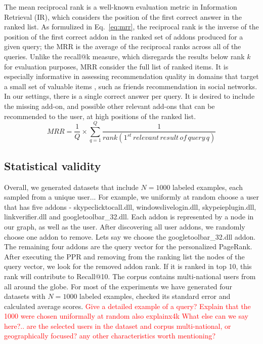 \documentclass[11pt,oneside]{book}
\let\Oldsubsection\subsection
\renewcommand{\subsection}{\FloatBarrier\Oldsubsection}
\begin{document}
The mean reciprocal rank \citep{voorhees1999trec} is a
well-known evaluation metric in Information Retrieval (IR), which considers the position of the first correct
answer in the ranked list.  As formulized in Eq.~\eqref{eq:mrr}, the reciprocal rank is the inverse of the position of the first correct addon in the ranked set of addons produced for a given query; the MRR is the average of the reciprocal ranks across all of the queries. Unlike the recall@k measure, which disregards the results below rank $k$ for evaluation purposes, MRR consider the full list of ranked items. It is especially informative in assessing recommendation quality in domains that target a small set of valuable items \citep{chen2006less}, such as friends recommendation in social
networks. In our settings, there is a single correct answer per query. It is desired to include the missing add-on, and possible other relevant add-ons that can be recommended to the user, at high positions of the ranked list.
\begin{equation}
 MRR = \frac{1}{Q} \times \displaystyle\sum\limits_{q=1}^{Q} \frac{1}{rank(1^{st} \, relevant \, result \, of \, query \, q)}
\label{eq:mrr}
\end{equation}

\subsection{Statistical validity}

Overall, we generated datasets that include $N=1000$ labeled examples, each sampled from a unique user...
For example, we uniformly at random choose a user that has five addons - skypeclicktocall.dll, windowslivelogin.dll, skypeieplugin.dll, linkverifier.dll and googletoolbar\_32.dll. Each addon is represented by a node in our graph, as well as the user. After discovering all user addons, we randomly choose one addon to remove. Lets say we choose the googletoolbar\_32.dll addon. The remaining four addons are the query vector for the personalized PageRank. After executing the PPR and removing from the ranking list the nodes of the query vector, we look for the removed addon rank. If it is ranked in top 10, this rank will contribute to Recall@10.
The corpus contains multi-national users from all around the globe.
For most of the experiments we have generated four datasets with $N=1000$ labeled examples, checked its standard error and calculated average scores.
\iffalse
\textcolor{red}{Give a detailed example of a query?
Explain that the 1000 were chosen uniformally at random
also explainx4k
What else can we say here?.. are the selected users in
  the dataset and corpus multi-national, or geographically focused?
  any other characteristics worth mentioning?}
\end{document}

